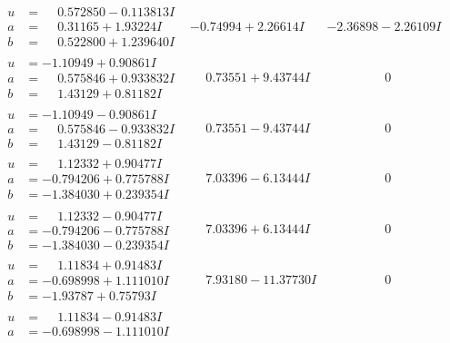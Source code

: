 \documentclass[1p]{elsarticle_modified}
\theoremstyle{definition}
\begin{document}
$$\begin{array}{c|c|c}
 \hline 
\begin{aligned}
u &= \phantom{-}0.572850 - 0.113813 I \\
a &= \phantom{-}0.31165 + 1.93224 I \\
b &= \phantom{-}0.522800 + 1.239640 I\end{aligned}
 & -0.74994 + 2.26614 I & -2.36898 - 2.26109 I \\ \hline\begin{aligned}
u &= -1.10949 + 0.90861 I \\
a &= \phantom{-}0.575846 + 0.933832 I \\
b &= \phantom{-}1.43129 + 0.81182 I\end{aligned}
 & \phantom{-}0.73551 + 9.43744 I & \phantom{-0.000000 } 0 \\ \hline\begin{aligned}
u &= -1.10949 - 0.90861 I \\
a &= \phantom{-}0.575846 - 0.933832 I \\
b &= \phantom{-}1.43129 - 0.81182 I\end{aligned}
 & \phantom{-}0.73551 - 9.43744 I & \phantom{-0.000000 } 0 \\ \hline\begin{aligned}
u &= \phantom{-}1.12332 + 0.90477 I \\
a &= -0.794206 + 0.775788 I \\
b &= -1.384030 + 0.239354 I\end{aligned}
 & \phantom{-}7.03396 - 6.13444 I & \phantom{-0.000000 } 0 \\ \hline\begin{aligned}
u &= \phantom{-}1.12332 - 0.90477 I \\
a &= -0.794206 - 0.775788 I \\
b &= -1.384030 - 0.239354 I\end{aligned}
 & \phantom{-}7.03396 + 6.13444 I & \phantom{-0.000000 } 0 \\ \hline\begin{aligned}
u &= \phantom{-}1.11834 + 0.91483 I \\
a &= -0.698998 + 1.111010 I \\
b &= -1.93787 + 0.75793 I\end{aligned}
 & \phantom{-}7.93180 - 11.37730 I & \phantom{-0.000000 } 0 \\ \hline\begin{aligned}
u &= \phantom{-}1.11834 - 0.91483 I \\
a &= -0.698998 - 1.111010 I \\

\end{aligned}
\end{array}$$
\end{document}
